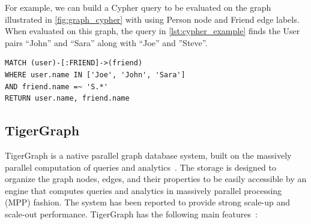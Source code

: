 For example, we can build a Cypher query to be evaluated on the graph illustrated in \autoref{fig:graph_cypher} with using \textsf{Person} node and \textsf{Friend} edge labels.
When evaluated on this graph, the query in \autoref{lst:cypher_example} finds the \textsf{User} pairs ``John'' and ``Sara'' along with ``Joe'' and ''Steve''.

\begin{lstlisting}[language=Cypher,frame=single,label={lst:cypher_example},caption={Example query in Cypher}]
MATCH (user)-[:FRIEND]->(friend)
WHERE user.name IN ['Joe', 'John', 'Sara'] 
AND friend.name =~ 'S.*'
RETURN user.name, friend.name
\end{lstlisting}

\subsection{TigerGraph}

TigerGraph is a native parallel graph database system, built on the massively parallel computation of queries and analytics~\cite{tigergraph_website}.
The storage is designed to organize the graph nodes, edges, and their properties to be easily accessible by an engine that computes queries and analytics in massively parallel processing (MPP) fashion.
The system has been reported to provide strong scale-up and scale-out performance.
TigerGraph has the following main features~\cite{DBLP:journals/corr/abs-1901-08248}:


